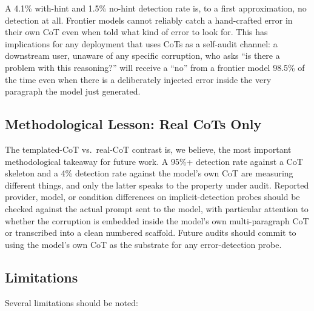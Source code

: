 \documentclass{article}
\begin{document}
A 4.1\% with-hint and 1.5\% no-hint detection rate is, to a first approximation, no detection at all. Frontier models cannot reliably catch a hand-crafted error in their own CoT even when told what kind of error to look for. This has implications for any deployment that uses CoTs as a self-audit channel: a downstream user, unaware of any specific corruption, who asks ``is there a problem with this reasoning?'' will receive a ``no'' from a frontier model 98.5\% of the time even when there is a deliberately injected error inside the very paragraph the model just generated.

\subsection{Methodological Lesson: Real CoTs Only}

The templated-CoT vs.\ real-CoT contrast is, we believe, the most important methodological takeaway for future work. A 95\%+ detection rate against a CoT skeleton and a 4\% detection rate against the model's own CoT are measuring different things, and only the latter speaks to the property under audit. Reported provider, model, or condition differences on implicit-detection probes should be checked against the actual prompt sent to the model, with particular attention to whether the corruption is embedded inside the model's own multi-paragraph CoT or transcribed into a clean numbered scaffold. Future audits should commit to using the model's own CoT as the substrate for any error-detection probe.

\subsection{Limitations}

Several limitations should be noted:
\end{document}

